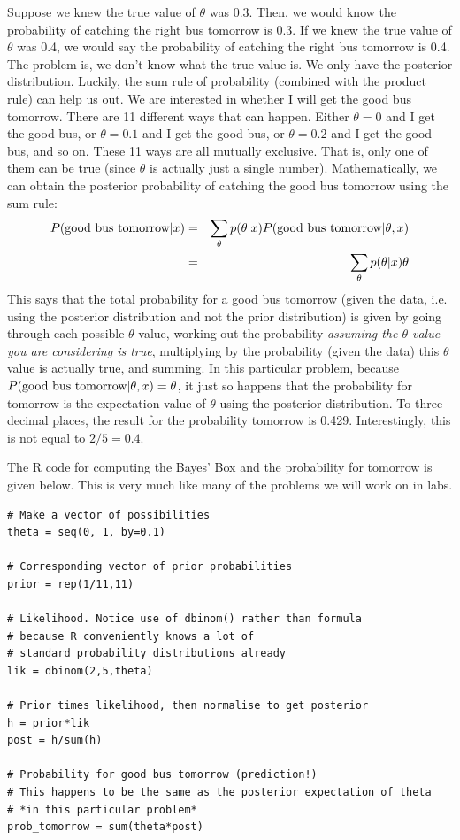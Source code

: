 Suppose we knew the true value of $\theta$ was 0.3. Then, we would know
the probability of catching the right bus tomorrow is 0.3. If we knew the
true value of $\theta$ was 0.4, we would say the probability of catching
the right bus tomorrow is 0.4. The problem is, we don't know what the true value
is. We only have the posterior distribution. Luckily, the sum rule of
probability (combined with the product rule) can help us out. We are interested in whether I will get the good
bus tomorrow. There are 11 different ways that can happen. Either $\theta=0$ and
I get the good bus, or $\theta=0.1$ and I get the good bus, or $\theta=0.2$ and
I get the good bus, and so on. These 11 ways are all mutually exclusive. That is,
only one of them can be true (since $\theta$ is actually just a single number).
Mathematically, we can obtain the posterior probability of catching the good
bus tomorrow using the sum rule:
\begin{eqnarray}
P(\textnormal{good bus tomorrow} | x) &=& \sum_{\theta}
p(\theta | x)P(\textnormal{good bus tomorrow} | \theta, x)\\
&=& \sum_{\theta}
p(\theta | x)\theta
\end{eqnarray}
This says that the total probability for a good bus tomorrow (given the data,
i.e. using the posterior distribution and not the prior distribution)
is given by going through each possible $\theta$ value, working out the probability
{\it assuming the $\theta$ value you are considering is true}, multiplying by the probability
(given the data) this $\theta$ value is actually true, and summing. In this
particular problem, because $P(\textnormal{good bus tomorrow} | \theta, x) = \theta$, it
just so happens that the probability for tomorrow is the expectation value of
$\theta$ using the posterior distribution. To three decimal places, the result
for the probability tomorrow is 0.429. Interestingly, this is not equal to
$2/5 = 0.4$.

The R code for computing the Bayes' Box and the probability for tomorrow
is given below. This is
very much like many of the problems we will work on in labs.

\begin{framed}
\begin{verbatim}
# Make a vector of possibilities
theta = seq(0, 1, by=0.1)

# Corresponding vector of prior probabilities
prior = rep(1/11,11)

# Likelihood. Notice use of dbinom() rather than formula
# because R conveniently knows a lot of
# standard probability distributions already
lik = dbinom(2,5,theta)

# Prior times likelihood, then normalise to get posterior
h = prior*lik
post = h/sum(h)

# Probability for good bus tomorrow (prediction!)
# This happens to be the same as the posterior expectation of theta
# *in this particular problem*
prob_tomorrow = sum(theta*post)
\end{verbatim}
\end{framed}

